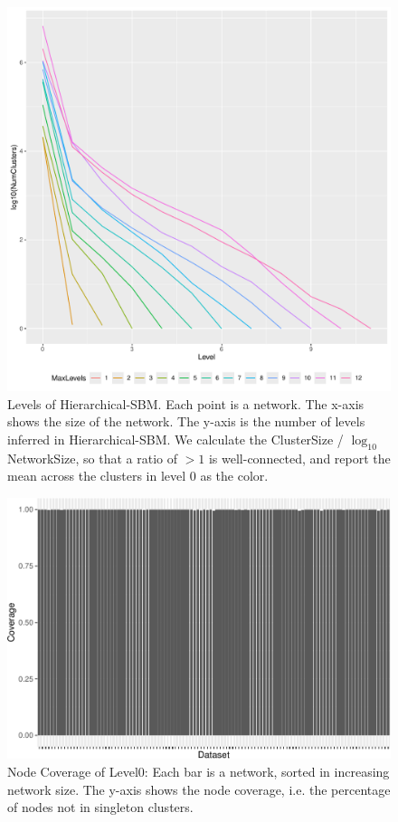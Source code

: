 \documentclass[aps,pre,superscriptaddress]{revtex4}
\begin{document}
\begin{figure}[ht]
	\includegraphics[width=\textwidth]{fig2.pdf}
	\caption{Levels of Hierarchical-SBM.
		Each point is a network.
		The x-axis shows the size of the network.
		The y-axis is the number of levels inferred in Hierarchical-SBM.
		We calculate the ClusterSize / $\log_{10}$ NetworkSize, so that a ratio of $>1$ is well-connected, and report the mean across the clusters in level 0 as the color.}
	\label{figs:fig2}
\end{figure}

\begin{figure}[ht]
	\includegraphics[width=\textwidth]{fig3.pdf}
	\caption{Node Coverage of Level0:
		Each bar is a network, sorted in increasing network size.
		The y-axis shows the node coverage, i.e. the percentage of nodes not in singleton clusters.}
	\label{figs:fig3}
\end{figure}
\end{document}
